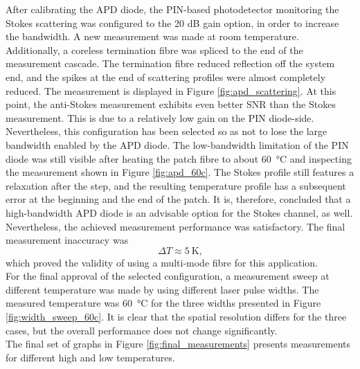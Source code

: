 \documentclass{standalone}
\begin{document}
After calibrating the APD diode, the PIN-based photodetector monitoring the Stokes scattering was configured to the 20 dB gain option, in order to increase the bandwidth. A new measurement was made at room temperature. Additionally, a coreless termination fibre was spliced to the end of the measurement cascade. The termination fibre reduced reflection off the system end, and the spikes at the end of scattering profiles were almost completely reduced. The measurement is displayed in Figure \ref{fig:apd_scattering}.
At this point, the anti-Stokes measurement exhibits even better SNR than the Stokes measurement. This is due to a relatively low gain on the PIN diode-side. Nevertheless, this configuration has been selected so as not to lose the large bandwidth enabled by the APD diode. The low-bandwidth limitation of the PIN diode was still visible after heating the patch fibre to about \SI{60}{\celsius} and inspecting the measurement shown in Figure \ref{fig:apd_60c}.
The Stokes profile still features a relaxation after the step, and the resulting temperature profile has a subsequent error at the beginning and the end of the patch. It is, therefore, concluded that a high-bandwidth APD diode is an advisable option for the Stokes channel, as well. Nevertheless, the achieved measurement performance was satisfactory. The final measurement inaccuracy was
\begin{equation}
\varDelta T \approx \SI{5}{\kelvin} \textrm{,}
\end{equation}
which proved the validity of using a multi-mode fibre for this application. \\

For the final approval of the selected configuration, a measurement sweep at different temperature was made by using different laser pulse widths. The measured temperature was \SI{60}{\celsius} for the three widths presented in Figure \ref{fig:width_sweep_60c}.
It is clear that the spatial resolution differs for the three cases, but the overall performance does not change significantly. \\

The final set of graphs in Figure \ref{fig:final_measurements} presents measurements for different high and low temperatures.



\setcounter{stranica}{\thepage}
\addtocounter{stranica}{1}
\end{document}
